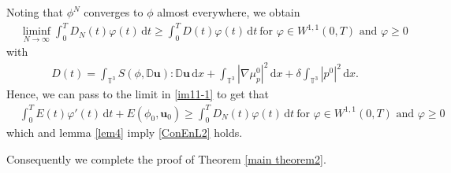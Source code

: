 \documentclass[reqno,a4paper,11pt]{amsart}
\theoremstyle{plain}
\numberwithin{equation}{section}
\renewcommand{\d}{\mathrm{d}}
\newcommand{\dt}{\d t}
\begin{document}
Noting that $\phi^{N}$ converges  to $\phi$ almost everywhere, we obtain
\begin{align*}
	&\nonumber \liminf_{N\to\infty}\int_{0}^T D_{N}(t)\varphi(t) \,\dt
	\geq \int_{0}^T D(t)\varphi(t)  \,\dt \ \text{for $\varphi\in W^{1,1}(0,T)$ and $\varphi\geq0$ }
\end{align*}
with
\begin{align*}
	D(t)=\int_{\mathbb{T}^{3}}S(\phi,\mathbb{ D}\mathbf{u}):\mathbb{ D}\mathbf{u}\,\mathrm dx
	+\int_{\mathbb{T}^{3}}|\nabla \mu_{p}^{0}|^{2}\,\mathrm dx+\delta\int_{\mathbb{T}^{3}}|{p}^{0}|^{2}\,\mathrm dx.
\end{align*}
Hence, we can pass to the limit in \eqref{im11-1} to get  that
\begin{align}\label{im13-1}
	&\int_0^{T}E(t)\varphi'(t) \,\dt+E(\phi_{0},\mathbf{u}_{0})\geq \int_0^{T}D_{N}(t)\varphi(t) \,\dt
	\ \text{for $\varphi\in W^{1,1}(0,T)$ and $\varphi\geq0$ }
\end{align}
which and  lemma \ref{lem4} imply  \eqref{ConEnL2} holds.

Consequently we complete the proof of Theorem \ref{main theorem2}.
\end{document}
